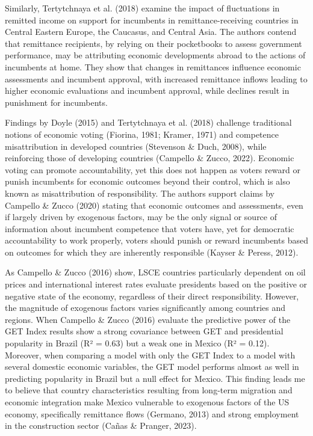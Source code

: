 \documentclass[
]{article}
\begin{document}
Similarly, Tertytchnaya et al. (2018) examine the impact of fluctuations
in remitted income on support for incumbents in remittance-receiving
countries in Central Eastern Europe, the Caucasus, and Central Asia. The
authors contend that remittance recipients, by relying on their
pocketbooks to assess government performance, may be attributing
economic developments abroad to the actions of incumbents at home. They
show that changes in remittances influence economic assessments and
incumbent approval, with increased remittance inflows leading to higher
economic evaluations and incumbent approval, while declines result in
punishment for incumbents.

Findings by Doyle (2015) and Tertytchnaya et al. (2018) challenge
traditional notions of economic voting (Fiorina, 1981; Kramer, 1971) and
competence misattribution in developed countries (Stevenson \& Duch,
2008), while reinforcing those of developing countries (Campello \&
Zucco, 2022). Economic voting can promote accountability, yet this does
not happen as voters reward or punish incumbents for economic outcomes
beyond their control, which is also known as misattribution of
responsibility. The authors support claims by Campello \& Zucco (2020)
stating that economic outcomes and assessments, even if largely driven
by exogenous factors, may be the only signal or source of information
about incumbent competence that voters have, yet for democratic
accountability to work properly, voters should punish or reward
incumbents based on outcomes for which they are inherently responsible
(Kayser \& Peress, 2012).

As Campello \& Zucco (2016) show, LSCE countries particularly dependent
on oil prices and international interest rates evaluate presidents based
on the positive or negative state of the economy, regardless of their
direct responsibility. However, the magnitude of exogenous factors
varies significantly among countries and regions. When Campello \& Zucco
(2016) evaluate the predictive power of the GET Index results show a
strong covariance between GET and presidential popularity in Brazil (R²
= 0.63) but a weak one in Mexico (R² = 0.12). Moreover, when comparing a
model with only the GET Index to a model with several domestic economic
variables, the GET model performs almost as well in predicting
popularity in Brazil but a null effect for Mexico. This finding leads me
to believe that country characteristics resulting from long-term
migration and economic integration make Mexico vulnerable to exogenous
factors of the US economy, specifically remittance flows (Germano, 2013)
and strong employment in the construction sector (Cañas \& Pranger,
2023).
\end{document}
